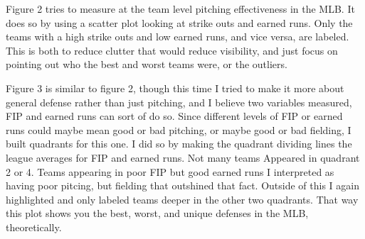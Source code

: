 \documentclass{article}
\begin{document}
Figure 2 tries to measure at the team level pitching effectiveness in the MLB. It does so by using a scatter plot looking at strike outs and earned runs. Only the teams with a high strike outs and low earned runs, and vice versa, are labeled. This is both to reduce clutter that would reduce visibility, and just focus on pointing out who the best and worst teams were, or the outliers. 

Figure 3 is similar to figure 2, though this time I tried to make it more about general defense rather than just pitching, and I believe two variables measured, FIP and earned runs can sort of do so. Since different levels of FIP or earned runs could maybe mean good or bad pitching, or maybe good or bad fielding, I built quadrants for this one. I did so by making the quadrant dividing lines the league averages for FIP and earned runs. Not many teams Appeared in quadrant 2 or 4. Teams appearing in poor FIP but good earned runs I interpreted as having poor pitcing, but fielding that outshined that fact. Outside of this I again highlighted and only labeled teams deeper in the other two quadrants. That way this plot shows you the best, worst, and unique defenses in the MLB, theoretically. 
\end{document}
